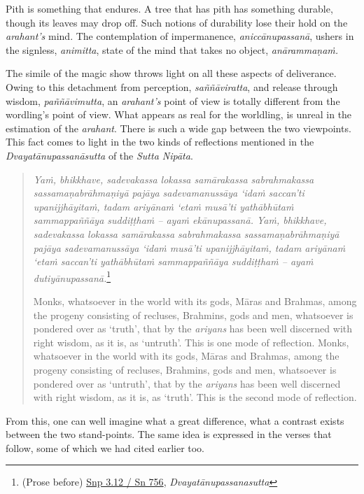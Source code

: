 Pith is something that endures. A tree that has pith has something durable, though its leaves may drop off. Such notions of durability lose their hold on the \emph{arahant's} mind. The contemplation of impermanence, \emph{aniccānupassanā}, ushers in the signless, \emph{animitta}, state of the mind that takes no object, \emph{anārammaṇaṁ.}

The simile of the magic show throws light on all these aspects of deliverance. Owing to this detachment from perception, \emph{saññāviratta}, and release through wisdom, \emph{paññāvimutta}, an \emph{arahant's} point of view is totally different from the wordling's point of view. What appears as real for the worldling, is unreal in the estimation of the \emph{arahant}. There is such a wide gap between the two viewpoints. This fact comes to light in the two kinds of reflections mentioned in the \emph{Dvayatānupassanāsutta} of the \emph{Sutta Nipāta}.

\begin{quote}
\emph{Yaṁ, bhikkhave, sadevakassa lokassa samārakassa sabrahmakassa sassamaṇabrāhmaṇiyā pajāya sadevamanussāya `idaṁ saccan'ti upanijjhāyitaṁ, tadam ariyānaṁ `etaṁ musā'ti yathābhūtaṁ sammappaññāya suddiṭṭhaṁ -- ayaṁ ekānupassanā. Yaṁ, bhikkhave, sadevakassa lokassa samārakassa sabrahmakassa sassamaṇabrāhmaṇiyā pajāya sadevamanussāya `idaṁ musā'ti upanijjhāyitaṁ, tadam ariyānaṁ `etaṁ saccan'ti yathābhūtaṁ sammappaññāya suddiṭṭhaṁ -- ayaṁ dutiyānupassanā.}\footnote{(Prose before) \href{https://suttacentral.net/snp3.12/pli/ms}{Snp 3.12 / Sn 756}, \emph{Dvayatānupassanasutta}}

Monks, whatsoever in the world with its gods, Māras and Brahmas, among the progeny consisting of recluses, Brahmins, gods and men, whatsoever is pondered over as `truth', that by the \emph{ariyans} has been well discerned with right wisdom, as it is, as `untruth'. This is one mode of reflection. Monks, whatsoever in the world with its gods, Māras and Brahmas, among the progeny consisting of recluses, Brahmins, gods and men, whatsoever is pondered over as `untruth', that by the \emph{ariyans} has been well discerned with right wisdom, as it is, as `truth'. This is the second mode of reflection.
\end{quote}

From this, one can well imagine what a great difference, what a contrast exists between the two stand-points. The same idea is expressed in the verses that follow, some of which we had cited earlier too.

